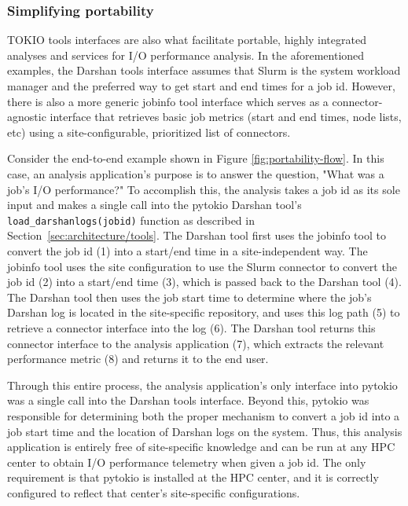 \subsubsection{Simplifying portability}

TOKIO tools interfaces are also what facilitate portable, highly integrated analyses and services for I/O performance analysis.
In the aforementioned examples, the Darshan tools interface assumes that Slurm is the system workload manager and the preferred way to get start and end times for a job id.
However, there is also a more generic jobinfo tool interface which serves as a connector-agnostic interface that retrieves basic job metrics (start and end times, node lists, etc) using a site-configurable, prioritized list of connectors.

Consider the end-to-end example shown in Figure \ref{fig:portability-flow}.  
In this case, an analysis application's purpose is to answer the question, "What was a job's I/O performance?"
To accomplish this, the analysis takes a job id as its sole input and makes a single call into the pytokio Darshan tool's \texttt{load\_darshanlogs(jobid)} function as described in Section~\ref{sec:architecture/tools}.
The Darshan tool first uses the jobinfo tool to convert the job id (1) into a start/end time in a site-independent way.
The jobinfo tool uses the site configuration to use the Slurm connector to convert the job id (2) into a start/end time (3), which is passed back to the Darshan tool (4).
The Darshan tool then uses the job start time to determine where the job's Darshan log is located in the site-specific repository, and uses this log path (5) to retrieve a connector interface into the log (6).
The Darshan tool returns this connector interface to the analysis application (7), which extracts the relevant performance metric (8) and returns it to the end user.

Through this entire process, the analysis application's only interface into pytokio was a single call into the Darshan tools interface.
Beyond this, pytokio was responsible for determining both the proper mechanism to convert a job id into a job start time and the location of Darshan logs on the system.
Thus, this analysis application is entirely free of site-specific knowledge and can be run at any HPC center to obtain I/O performance telemetry when given a job id.
The only requirement is that pytokio is installed at the HPC center, and it is correctly configured to reflect that center's site-specific configurations.


